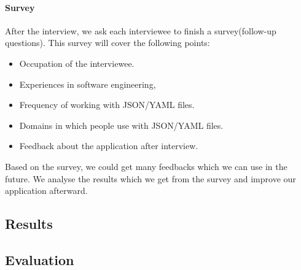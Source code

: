 \paragraph{Survey}
After the interview, we ask each interviewee to finish a survey(follow-up questions).
This survey will cover the following points:
\begin{itemize}
    \item Occupation of the interviewee.
    \item Experiences in software engineering,
    \item Frequency of working with JSON/YAML files.
    \item Domains in which people use with JSON/YAML files.
    \item Feedback about the application after interview.
\end{itemize}
Based on the survey, we could get many feedbacks which we can use in the future.
We analyse the results which we get from the survey and improve our application afterward.

\subsection{Results}

\subsection{Evaluation}


